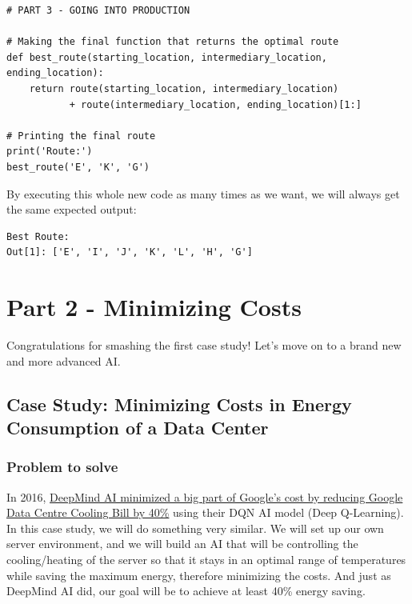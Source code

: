 \documentclass[]{book}
\begin{document}
\begin{lstlisting}
# PART 3 - GOING INTO PRODUCTION

# Making the final function that returns the optimal route
def best_route(starting_location, intermediary_location, ending_location):
    return route(starting_location, intermediary_location)
           + route(intermediary_location, ending_location)[1:]

# Printing the final route
print('Route:')
best_route('E', 'K', 'G')
\end{lstlisting}

By executing this whole new code as many times as we want, we will always get the same expected output:

\begin{lstlisting}
Best Route:
Out[1]: ['E', 'I', 'J', 'K', 'L', 'H', 'G']
\end{lstlisting}

\hypertarget{part-2---minimizing-costs}{%
\chapter{Part 2 - Minimizing Costs}\label{part-2---minimizing-costs}}

Congratulations for smashing the first case study! Let's move on to a brand new and more advanced AI.

\hypertarget{case-study-minimizing-costs-in-energy-consumption-of-a-data-center}{%
\section{Case Study: Minimizing Costs in Energy Consumption of a Data Center}\label{case-study-minimizing-costs-in-energy-consumption-of-a-data-center}}

\hypertarget{problem-to-solve-1}{%
\subsection{Problem to solve}\label{problem-to-solve-1}}

In 2016, \href{https://deepmind.com/blog/deepmind-ai-reduces-google-data-centre-cooling-bill-40/}{DeepMind AI minimized a big part of Google's cost by reducing Google Data Centre Cooling Bill by 40\%} using their DQN AI model (Deep Q-Learning). In this case study, we will do something very similar. We will set up our own server environment, and we will build an AI that will be controlling the cooling/heating of the server so that it stays in an optimal range of temperatures while saving the maximum energy, therefore minimizing the costs. And just as DeepMind AI did, our goal will be to achieve at least 40\% energy saving.
\end{document}
